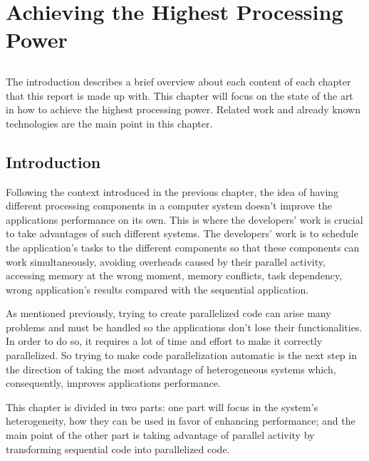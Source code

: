 \chapter{Achieving the Highest Processing Power} \label{chap:sota1}
\section*{}

The introduction describes a brief overview about each content of each chapter that this report is made up with. This chapter will focus on the state of the art in how to achieve the highest processing power. Related work and already known technologies are the main point in this chapter.  


\section{Introduction}

Following the context introduced in the previous chapter, the idea of having different processing components in a computer system doesn't improve the applications performance on its own. This is where the developers' work is crucial to take advantages of such different systems. The developers' work is to schedule the application's tasks to the different components so that these components can work simultaneously, avoiding overheads caused by their parallel activity, accessing memory at the wrong moment, memory conflicts, task dependency, wrong application's results compared with the sequential application.~\cite{Lee}

As mentioned previously, trying to create parallelized code can arise many problems and must be handled so the applications don't lose their functionalities. In order to do so, it requires a lot of time and effort to make it correctly parallelized. So trying to make code parallelization automatic is the next step in the direction of taking the most advantage of heterogeneous systems which, consequently, improves applications performance. 

This chapter is divided in two parts: one part will focus in the system's heterogeneity, how they can be used in favor of enhancing performance; and the main point of the other part is taking advantage of parallel activity by transforming sequential code into parallelized code.


